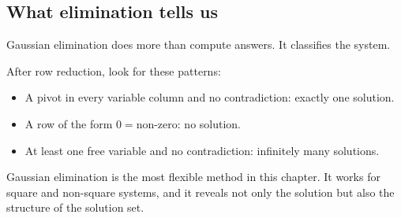 \subsection*{What elimination tells us}

Gaussian elimination does more than compute answers. It classifies the system.

\begin{summarybox}
After row reduction, look for these patterns:
\begin{itemize}
\item A pivot in every variable column and no contradiction: exactly one solution.
\item A row of the form \(0=\text{non-zero}\): no solution.
\item At least one free variable and no contradiction: infinitely many solutions.
\end{itemize}
\end{summarybox}

Gaussian elimination is the most flexible method in this chapter. It works for square and non-square systems, and it reveals not only the solution but also the structure of the solution set.